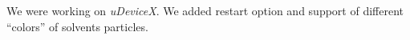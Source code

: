 We were working on \textit{uDeviceX}. We added restart option and
support of different ``colors'' of solvents particles.
